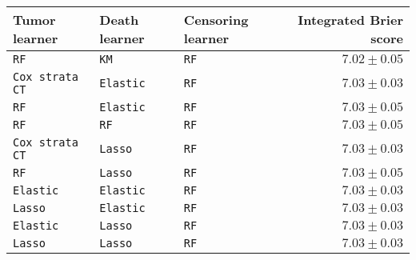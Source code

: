 \begin{tabular}{lllr}
  \toprule
Tumor learner & Death learner & Censoring learner & Integrated Brier score \\ 
  \midrule
\texttt{RF} & \texttt{KM} & \texttt{RF} & $7.02\pm0.05$ \\ 
  \texttt{Cox strata CT} & \texttt{Elastic} & \texttt{RF} & $7.03\pm0.03$ \\ 
  \texttt{RF} & \texttt{Elastic} & \texttt{RF} & $7.03\pm0.05$ \\ 
  \texttt{RF} & \texttt{RF} & \texttt{RF} & $7.03\pm0.05$ \\ 
  \texttt{Cox strata CT} & \texttt{Lasso} & \texttt{RF} & $7.03\pm0.03$ \\ 
  \texttt{RF} & \texttt{Lasso} & \texttt{RF} & $7.03\pm0.05$ \\ 
  \texttt{Elastic} & \texttt{Elastic} & \texttt{RF} & $7.03\pm0.03$ \\ 
  \texttt{Lasso} & \texttt{Elastic} & \texttt{RF} & $7.03\pm0.03$ \\ 
  \texttt{Elastic} & \texttt{Lasso} & \texttt{RF} & $7.03\pm0.03$ \\ 
  \texttt{Lasso} & \texttt{Lasso} & \texttt{RF} & $7.03\pm0.03$ \\ 
   \bottomrule
\end{tabular}
